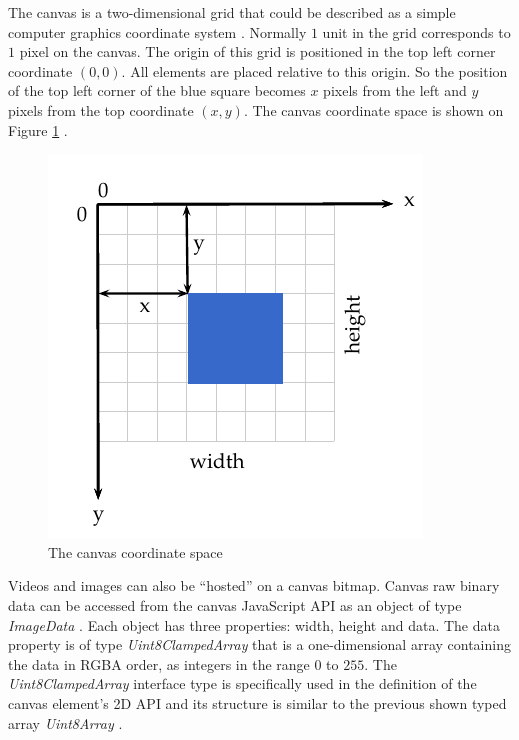  The canvas \cite{Canvas2013} is a two-dimensional grid that could be described as a simple computer graphics coordinate system \cite{Hartley2004}. Normally $1$ unit in the grid corresponds to $1$ pixel on the canvas. The origin of this grid is positioned in the top left corner coordinate $(0,0)$. All elements are placed relative to this origin. So the position of the top left corner of the blue square becomes $x$ pixels from the left and $y$ pixels from the top coordinate $(x,y)$. The canvas coordinate space is shown on Figure \ref{figure:canvas_axis} \cite{MDN2013}.

 \begin{figure}[!htb]
   \centering
   \includegraphics{chapters/basic_concepts/canvas_axis.pdf}
   \caption{The canvas coordinate space}
   \label{figure:canvas_axis}
 \end{figure}

 Videos and images can also be ``hosted'' on a canvas bitmap. Canvas raw binary data can be accessed from the canvas \cite{Canvas2013} JavaScript API as an object of type \textit{ImageData} \cite{Canvas2013}. Each object has three properties: width, height and data. The data property is of type \textit{Uint8ClampedArray} that is a one-dimensional array containing the data in RGBA order, as integers in the range $0$ to $255$. The \textit{Uint8ClampedArray} interface type is specifically used in the definition of the canvas element's 2D API and its structure is  similar to the previous shown typed array \textit{Uint8Array} \cite{Canvas2013} \cite{TypedArray2013}.

